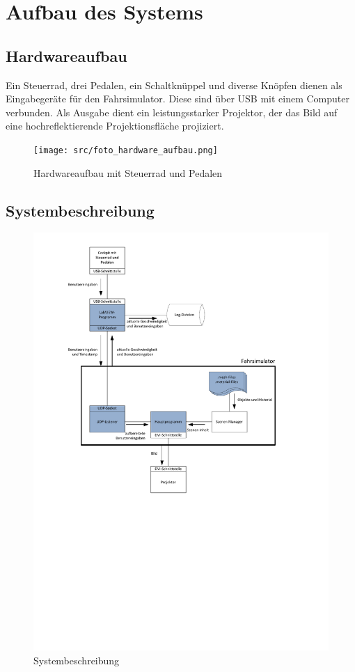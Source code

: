 \section{Aufbau des Systems}
\subsection{Hardwareaufbau}
Ein Steuerrad, drei Pedalen, ein Schaltknüppel und diverse Knöpfen dienen als Eingabegeräte für den Fahrsimulator. Diese sind über USB mit einem Computer verbunden. Als Ausgabe dient ein leistungsstarker Projektor, der das Bild auf eine hochreflektierende Projektionsfläche projiziert.

\begin{figure}[H]
\centering 
\texttt{[image: src/foto\_hardware\_aufbau.png]}
\caption{Hardwareaufbau mit Steuerrad und Pedalen} %
\label{Hardwareaufbau} %
\end{figure}

\newpage

\subsection{Systembeschreibung}

\begin{figure}[H]
\centering 
\includegraphics[width=1\linewidth]{src/Systembeschreibung.pdf}
\caption{Systembeschreibung} %
\label{Systembeschreibung} %
\end{figure}

